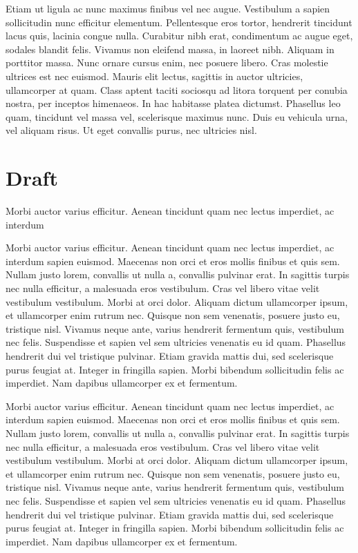 \documentclass[12pt,a4paper]{memoir}
\begin{document}
 Etiam ut ligula ac nunc maximus finibus vel nec augue. Vestibulum a sapien sollicitudin nunc efficitur elementum. Pellentesque eros tortor, hendrerit tincidunt lacus quis, lacinia congue nulla. Curabitur nibh erat, condimentum ac augue eget, sodales blandit felis. Vivamus non eleifend massa, in laoreet nibh. Aliquam in porttitor massa. Nunc ornare cursus enim, nec posuere libero. Cras molestie ultrices est nec euismod. Mauris elit lectus, sagittis in auctor ultricies, ullamcorper at quam. Class aptent taciti sociosqu ad litora torquent per conubia nostra, per inceptos himenaeos. In hac habitasse platea dictumst. Phasellus leo quam, tincidunt vel massa vel, scelerisque maximus nunc. Duis eu vehicula urna, vel aliquam risus. Ut eget convallis purus, nec ultricies nisl.

\section{Draft}

\begin{cwdraft}
    Morbi auctor varius efficitur. Aenean tincidunt quam nec lectus imperdiet, ac interdum
\end{cwdraft}

\begin{cwdraft}
Morbi auctor varius efficitur. Aenean tincidunt quam nec lectus imperdiet, ac interdum sapien euismod. Maecenas non orci et eros mollis finibus et quis sem. Nullam justo lorem, convallis ut nulla a, convallis pulvinar erat. In sagittis turpis nec nulla efficitur, a malesuada eros vestibulum. Cras vel libero vitae velit vestibulum vestibulum. Morbi at orci dolor. Aliquam dictum ullamcorper ipsum, et ullamcorper enim rutrum nec. Quisque non sem venenatis, posuere justo eu, tristique nisl. Vivamus neque ante, varius hendrerit fermentum quis, vestibulum nec felis. Suspendisse et sapien vel sem ultricies venenatis eu id quam. Phasellus hendrerit dui vel tristique pulvinar. Etiam gravida mattis dui, sed scelerisque purus feugiat at. Integer in fringilla sapien. Morbi bibendum sollicitudin felis ac imperdiet. Nam dapibus ullamcorper ex et fermentum.
\end{cwdraft}

\begin{cwdraft}[A draft]
    Morbi auctor varius efficitur. Aenean tincidunt quam nec lectus imperdiet, ac interdum sapien euismod. Maecenas non orci et eros mollis finibus et quis sem. Nullam justo lorem, convallis ut nulla a, convallis pulvinar erat. In sagittis turpis nec nulla efficitur, a malesuada eros vestibulum. Cras vel libero vitae velit vestibulum vestibulum. Morbi at orci dolor. Aliquam dictum ullamcorper ipsum, et ullamcorper enim rutrum nec. Quisque non sem venenatis, posuere justo eu, tristique nisl. Vivamus neque ante, varius hendrerit fermentum quis, vestibulum nec felis. Suspendisse et sapien vel sem ultricies venenatis eu id quam. Phasellus hendrerit dui vel tristique pulvinar. Etiam gravida mattis dui, sed scelerisque purus feugiat at. Integer in fringilla sapien. Morbi bibendum sollicitudin felis ac imperdiet. Nam dapibus ullamcorper ex et fermentum.
\end{cwdraft}
\end{document}
